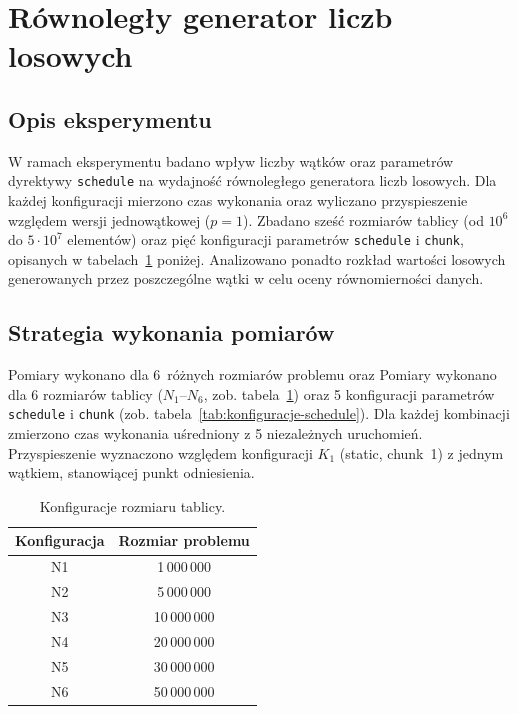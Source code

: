 \documentclass[12pt, a4paper]{article}
\begin{document}
\section{Równoległy generator liczb losowych}

\subsection{Opis eksperymentu}

W ramach eksperymentu badano wpływ liczby wątków oraz parametrów dyrektywy
\texttt{schedule} na wydajność równoległego generatora liczb losowych.
Dla każdej konfiguracji mierzono czas wykonania oraz wyliczano przyspieszenie
względem wersji jednowątkowej ($p = 1$). Zbadano sześć rozmiarów tablicy
(od $10^6$ do $5 \cdot 10^7$ elementów) oraz pięć konfiguracji parametrów
\texttt{schedule} i \texttt{chunk}, opisanych w tabelach~\ref{tab:konfiguracje}
poniżej. Analizowano ponadto rozkład wartości losowych generowanych przez
poszczególne wątki w celu oceny równomierności danych.

\subsection{Strategia wykonania pomiarów}
\label{sec:strategia}

Pomiary wykonano dla 6~różnych rozmiarów problemu oraz Pomiary wykonano dla 6 rozmiarów tablicy ($N_1$--$N_6$, zob. tabela~\ref{tab:konfiguracje})
oraz 5 konfiguracji parametrów \texttt{schedule} i \texttt{chunk}
(zob. tabela~\ref{tab:konfiguracje-schedule}). Dla każdej kombinacji
zmierzono czas wykonania uśredniony z 5 niezależnych uruchomień.
Przyspieszenie wyznaczono względem konfiguracji $K_1$ (static, chunk~1)
z jednym wątkiem, stanowiącej punkt odniesienia.

\begin{table}[H]
  \centering
  \caption{Konfiguracje rozmiaru tablicy.}
  \label{tab:konfiguracje}
  \begin{tabular}{cc}
    \toprule
    \textbf{Konfiguracja} & \textbf{Rozmiar problemu} \\
    \midrule
    N1 & 1\,000\,000   \\
    N2 & 5\,000\,000   \\
    N3 & 10\,000\,000  \\
    N4 & 20\,000\,000  \\
    N5 & 30\,000\,000  \\
    N6 & 50\,000\,000  \\
    \bottomrule
  \end{tabular}
\end{table}
\end{document}
